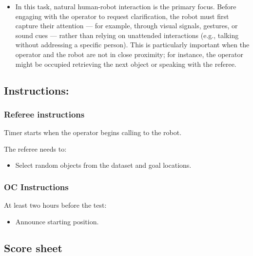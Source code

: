 \begin{enumerate}[nosep]
\begin{itemize}[nosep]
		\item In this task, natural human-robot interaction is the primary focus. Before engaging with the operator to request clarification, the robot must first capture their attention — for example, through visual signals, gestures, or sound cues — rather than relying on unattended interactions (e.g., talking without addressing a specific person). This is particularly important when the operator and the robot are not in close proximity; for instance, the operator might be occupied retrieving the next object or speaking with the referee.
	\end{itemize}
\end{enumerate}

\subsection*{Instructions:}
\subsubsection*{Referee instructions}

Timer starts when the operator begins calling to the robot.

The referee needs to:
\begin{itemize}[nosep]
	\item Select random objects from the dataset and goal locations.
\end{itemize}

\subsubsection*{OC Instructions}
At least two hours before the test:
\begin{itemize}[nosep]
	\item Announce starting position.
\end{itemize}

\subsection*{Score sheet}


